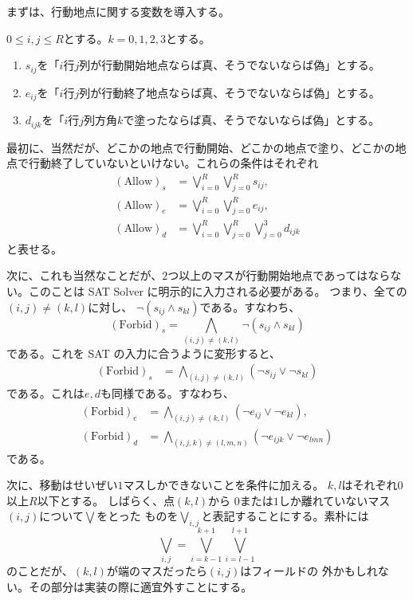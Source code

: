まずは、行動地点に関する変数を導入する。

\begin{nota}
 $0 \leq i, j \leq R$とする。$k = 0, 1, 2 ,3$とする。
 \begin{enumerate}[1.]
  \item $s_{ij}$を「$i$行$j$列が行動開始地点ならば真、そうでないならば偽」とする。
  \item $e_{ij}$を「$i$行$j$列が行動終了地点ならば真、そうでないならば偽」とする。
  \item $d_{ijk}$を「$i$行$j$列方角$k$で塗ったならば真、そうでないならば偽」とする。
 \end{enumerate}
\end{nota}

最初に、当然だが、どこかの地点で行動開始、どこかの地点で塗り、どこかの地
点で行動終了していないといけない。これらの条件はそれぞれ
\begin{align*}
 (\text{Allow})_s &= \bigvee_{i = 0}^R \bigvee_{j = 0}^R s_{ij}, \\
 (\text{Allow})_e &= \bigvee_{i = 0}^R \bigvee_{j = 0}^R e_{ij}, \\
 (\text{Allow})_d &=
 \bigvee_{i = 0}^R \bigvee_{j = 0}^R \bigvee_{j = 0}^3 d_{ijk}
\end{align*}
と表せる。

次に、これも当然なことだが、$2$つ以上のマスが行動開始地点であってはならな
い。このことは SAT Solver に明示的に入力される必要がある。
つまり、全ての$(i, j) \neq (k, l)$に対し、
$\lnot (s_{ij} \land s_{kl})$である。すなわち、
\[
 (\text{Forbid})_s = 
 \bigwedge_{(i, j) \neq (k, l)} \lnot
 (s_{ij} \land s_{kl})
\]
である。これを SAT の入力に合うように変形すると、
\begin{align*}
 (\text{Forbid})_s &= \bigwedge_{(i, j) \neq (k, l)} (\lnot
 s_{ij} \lor \lnot s_{kl}) 
\end{align*}
である。これは$e, d$も同様である。すなわち、
\begin{align*}
 (\text{Forbid})_e &= \bigwedge_{(i, j) \neq (k, l)} (\lnot
 e_{ij} \lor \lnot e_{kl}), \\
 (\text{Forbid})_d &= \bigwedge_{(i, j, k) \neq (l, m, n)} (\lnot
 e_{ijk} \lor \lnot e_{lmn})
\end{align*}
である。

次に、移動はせいぜい$1$マスしかできないことを条件に加える。
$k, l$はそれぞれ$0$以上$R$以下とする。
しばらく、点$(k, l)$から
$0$または$1$しか離れていないマス$(i, j)$について$\bigvee$をとった
ものを$\bigvee_{i, j}$と表記することにする。素朴には
\[
 \bigvee_{i, j} = \bigvee_{i = k-1}^{k+1} \bigvee_{i = l-1}^{l+1} 
\]
のことだが、$(k, l)$が端のマスだったら$(i, j)$はフィールドの
外かもしれない。その部分は実装の際に適宜外すことにする。

